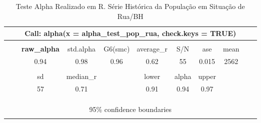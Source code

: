 \documentclass[12pt]{article}
\begin{document}
\begin{table}[htbp]
  \centering
  	\renewcommand{\arraystretch}{1.2}
  \caption{Teste Alpha Realizado em R. Série Histórica da População em Situação de Rua/BH}
    \tabcolsep=0.15cm
	\renewcommand{\arraystretch}{1.0}
	\begin{adjustbox}{max width=\linewidth}
    \begin{tabular}{rrrrrrrrrrr}
    \hline
    \multicolumn{11}{c}{Call: alpha(x = alpha\_test\_pop\_rua, check.keys = TRUE)} \\
    \midrule
         &      &      &      &      &      &      &      &      &      &  \\
\cmidrule{3-9}         &      & \multicolumn{1}{c}{\cellcolor[rgb]{ .851,  .851,  .851}\textbf{  raw\_alpha }} & \multicolumn{1}{c}{std.alpha } & \multicolumn{1}{c}{G6(smc) } & \multicolumn{1}{c}{average\_r } & \multicolumn{1}{c}{S/N   } & \multicolumn{1}{c}{ase } & \multicolumn{1}{c}{mean } &      &  \\
\cmidrule{3-9}         &      & \multicolumn{1}{c}{\cellcolor[rgb]{ .851,  .851,  .851}      0.94     } & \multicolumn{1}{c}{ 0.98   } & \multicolumn{1}{c}{ 0.96    } & \multicolumn{1}{c}{  0.62  } & \multicolumn{1}{c}{55} & \multicolumn{1}{c}{0.015} & \multicolumn{1}{c}{2562} &      &  \\
         &      &      &      &      &      &      &      &      &      &  \\
\cmidrule{3-8}         &      & \multicolumn{1}{c}{sd } & \multicolumn{1}{c}{median\_r} &      & \multicolumn{1}{c}{lower} & \multicolumn{1}{c}{alpha} & \multicolumn{1}{c}{upper} &      &      &  \\
\cmidrule{3-8}         &      & \multicolumn{1}{c}{57} & \multicolumn{1}{c}{ 0.71} &      & \multicolumn{1}{c}{0.91 } & \multicolumn{1}{c}{0.94 } & \multicolumn{1}{c}{0.97 } &      &      &  \\
         &      &      &      &      &      &      &      &      &      &  \\
         &      &      &      &      &      &      &      &      &      &  \\
         &      &      &      &      &      &      &      &      &      &  \\
    \midrule
    \multicolumn{11}{c}{95\% confidence boundaries						} \\
    \midrule
         &      &      &      &      &      &      &      &      &      &  \\

\end{tabular}
\end{adjustbox}
\end{table}
\end{document}
